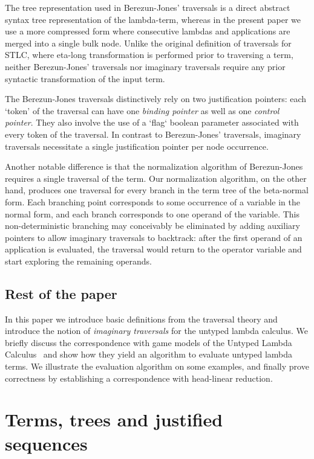 \documentclass{elsarticle}
\theoremstyle{plain}
\theoremstyle{definition}
\theoremstyle{remark}
\begin{document}
The tree representation used in Berezun-Jones' traversals is a direct abstract syntax tree representation of the lambda-term, whereas in the present paper we use a more compressed form where consecutive lambdas and applications are merged into a single bulk node. Unlike the original definition of traversals for STLC, where eta-long transformation is performed prior to traversing a term, neither Berezun-Jones' traversals nor imaginary traversals require any prior syntactic transformation of the input term.

The Berezun-Jones traversals distinctively rely on two justification pointers: each `token' of the traversal can have one \emph{binding pointer} as well as one \emph{control pointer}. They also involve the use of a `flag` boolean parameter associated with every token of the traversal. In contrast to Berezun-Jones' traversals, imaginary traversals necessitate a single justification pointer per node occurrence.

Another notable difference is that the normalization algorithm of Berezun-Jones requires a single traversal of the term. Our normalization algorithm, on the other hand, produces one traversal for every branch in the term tree of the beta-normal form. Each branching point corresponds to some occurrence of a variable in the normal form, and each branch corresponds to one operand of the variable. This non-deterministic branching may conceivably be eliminated by adding auxiliary pointers to allow imaginary traversals to backtrack: after the first operand of an application is evaluated, the traversal would return to the operator variable and start exploring the remaining operands.

\subsection{Rest of the paper}

In this paper we introduce basic definitions from the traversal theory and introduce the notion of \emph{imaginary traversals} for the untyped lambda calculus. We briefly discuss the correspondence with game models of the Untyped Lambda Calculus~\cite{KerThesis} and show how they yield an algorithm to evaluate untyped lambda terms. We illustrate the evaluation algorithm on some examples, and finally prove correctness by establishing a correspondence with head-linear reduction.

\section{Terms, trees and justified sequences}
\end{document}
